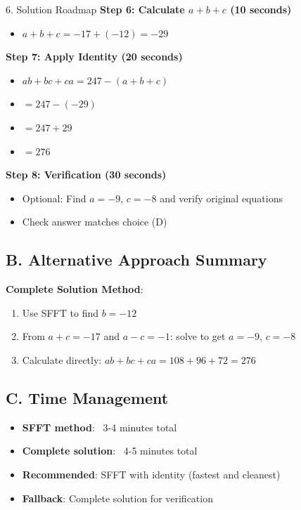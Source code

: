 \documentclass[12pt]{article}
\begin{document}
\begin{roadmapbox}{6. Solution Roadmap}
\textbf{Step 6: Calculate $a+b+c$ (10 seconds)}
\begin{itemize}
    \item $a + b + c = -17 + (-12) = -29$
\end{itemize}

\textbf{Step 7: Apply Identity (20 seconds)}
\begin{itemize}
    \item $ab + bc + ca = 247 - (a+b+c)$
    \item $= 247 - (-29)$
    \item $= 247 + 29$
    \item $= 276$
\end{itemize}

\textbf{Step 8: Verification (30 seconds)}
\begin{itemize}
    \item Optional: Find $a = -9$, $c = -8$ and verify original equations
    \item Check answer matches choice (D)
\end{itemize}

\subsection*{B. Alternative Approach Summary}

\textbf{Complete Solution Method}:
\begin{enumerate}
    \item Use SFFT to find $b = -12$
    \item From $a+c = -17$ and $a-c = -1$: solve to get $a = -9$, $c = -8$
    \item Calculate directly: $ab + bc + ca = 108 + 96 + 72 = 276$
\end{enumerate}

\subsection*{C. Time Management}
\begin{itemize}[leftmargin=*]
    \item \textbf{SFFT method}: ~3-4 minutes total
    \item \textbf{Complete solution}: ~4-5 minutes total
    \item \textbf{Recommended}: SFFT with identity (fastest and cleanest)
    \item \textbf{Fallback}: Complete solution for verification
\end{itemize}

\end{roadmapbox}
\end{document}
